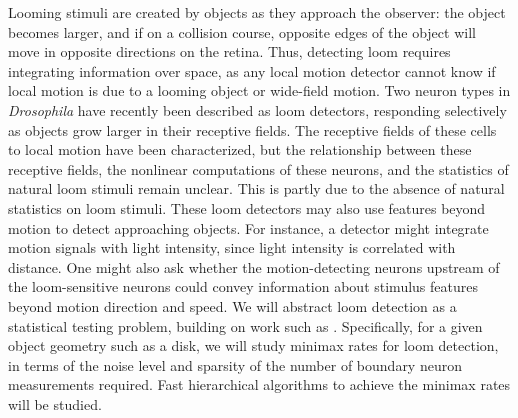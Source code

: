 Looming stimuli are created by objects as they approach the observer:
the object becomes larger, and if on a collision course,
opposite edges of the object will move in opposite directions on the
retina. Thus, detecting loom requires integrating information over
space, as any local motion detector cannot know if local motion is due
to a looming object or wide-field motion. Two neuron types in
\textit{Drosophila} have recently been described as loom detectors,
responding selectively as objects grow larger in their receptive
fields. The receptive fields of these cells to local motion have been
characterized, but the relationship between these receptive fields,
the nonlinear computations of these neurons, and the statistics of
natural loom stimuli remain unclear. This is partly due to the
absence of natural statistics on loom stimuli. These loom detectors 
may also use features beyond motion to
detect approaching objects. For instance, a detector might integrate
motion signals with light intensity, since light intensity
is correlated with distance. One might also ask whether the
motion-detecting neurons upstream of the loom-sensitive neurons could
convey information about stimulus features beyond motion
direction and speed. We will abstract loom detection as a statistical
testing problem, building on work such
as \citep{castro:05}. %
Specifically, for a given object
geometry such as a disk, we will study minimax rates for loom
detection, in terms of the noise level and sparsity of the number of
boundary neuron measurements required. Fast hierarchical algorithms
to achieve the minimax rates will be studied.



